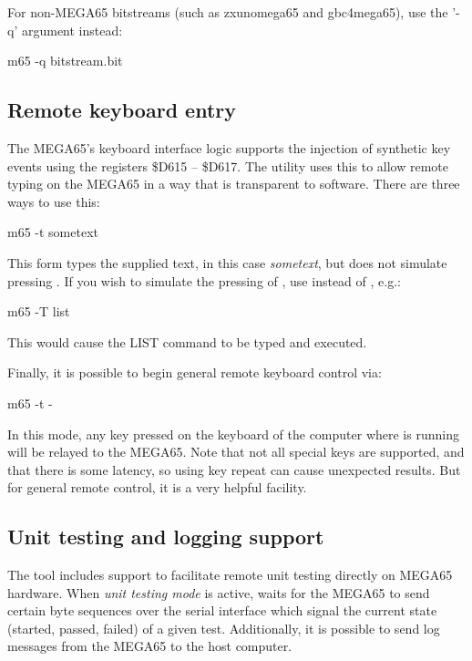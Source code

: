 For non-MEGA65 bitstreams (such as zxunomega65 and gbc4mega65), use the '-q' argument instead:

\begin{screencode}
m65 -q bitstream.bit
\end{screencode}

\subsection{Remote keyboard entry}

The MEGA65's keyboard interface logic supports the injection of
synthetic key events using the registers \$D615 -- \$D617.
The  utility uses this to allow remote typing on the MEGA65
in a way that is transparent to software.  There are three ways to use
this:

\begin{screencode}
m65 -t sometext
\end{screencode}

This form types the supplied text, in this case {\em sometext}, but
does not simulate pressing .  If you wish
to simulate the pressing of , use 
instead of , e.g.:

\begin{screencode}
m65 -T list
\end{screencode}

This would cause the LIST command to be typed and executed.

Finally, it is possible to begin general remote keyboard control via:

\begin{screencode}
m65 -t -
\end{screencode}

In this mode, any key pressed on the keyboard of the computer
where  is running will be relayed to the MEGA65.  Note that
not all special keys are supported, and that there is some latency, so
using key repeat can cause unexpected results.  But for general remote
control, it is a very helpful facility.

\subsection{Unit testing and logging support}

The  tool includes support to facilitate remote unit testing 
directly on MEGA65 hardware. When \textit{unit testing mode} is active, 
 waits for the MEGA65 to send certain byte sequences over the 
serial interface which signal the current state (started, passed, failed) 
of a given test. Additionally, it is possible to send log messages from 
the MEGA65 to the host computer.

